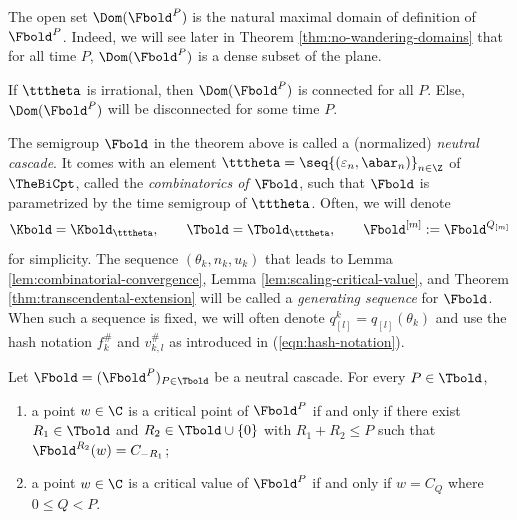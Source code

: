 \documentclass{amsart}
\begin{document}
\begin{remark}
    The open set $\Dom(\Fbold^P)$ is the natural maximal domain of definition of $\Fbold^P$.
    Indeed, we will see later in Theorem \ref{thm:no-wandering-domains} that for all time $P$, $\Dom(\Fbold^P)$ is a dense subset of the plane.
\end{remark}

\begin{remark}
    If $\tttheta$ is irrational, then $\Dom(\Fbold^P)$ is connected for all $P$.
    Else, $\Dom(\Fbold^P)$ will be disconnected for some time $P$.
\end{remark}

The semigroup $\Fbold$ in the theorem above is called a (normalized) \emph{neutral cascade}.
It comes with an element $\tttheta = \seq{ (\varepsilon_n, \abar_n) }_{n\in\Z}$ of $\TheBiCpt$, called the \emph{combinatorics of $\Fbold$}, such that $\Fbold$ is parametrized by the time semigroup of $\tttheta$.
Often, we will denote 
\[
    \Kbold = \Kbold_{\tttheta}, \qquad 
    \Tbold = \Tbold_{\tttheta}, \qquad
    \Fbold^{[m]} := \Fbold^{Q_{[m]}} 
\]
for simplicity.
The sequence $(\theta_k, n_k, u_k)$ that leads to Lemma \ref{lem:combinatorial-convergence}, Lemma \ref{lem:scaling-critical-value}, and Theorem \ref{thm:transcendental-extension} will be called a \emph{generating sequence} for $\Fbold$.
When such a sequence is fixed, we will often denote $q^k_{[l]} = q_{[l]}(\theta_k)$ and use the hash notation $f_k^{\#}$ and $v^{\#}_{k,l}$ as introduced in (\ref{eqn:hash-notation}).

\begin{lemma}
    \label{lem:crit-points}
    Let $\Fbold = (\Fbold^P)_{P \in \Tbold}$ be a neutral cascade.
    For every $P \in \Tbold$, 
    \begin{enumerate}
        \item a point $w \in \C$ is a critical point of $\Fbold^P$ if and only if there exist $R_1 \in \Tbold$ and $R_2 \in \Tbold \cup \{0\}$ with $R_1 + R_2\leq P$ such that $\Fbold^{R_2}(w) = C_{-R_1}$;
        \item a point $w \in \C$ is a critical value of $\Fbold^P$ if and only if $w = C_{Q}$ where $0 \leq Q < P$.
    \end{enumerate}
\end{lemma}
\end{document}
